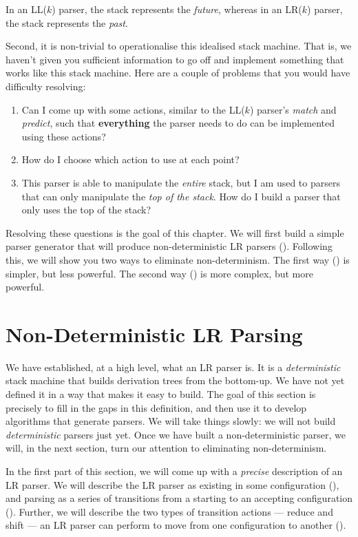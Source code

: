 In an LL($k$) parser, the stack represents the \textit{future}, whereas in an LR($k$) parser, the stack represents the \textit{past}.

Second, it is non-trivial to operationalise this idealised stack machine. That is, we haven't given you sufficient information to go off and implement something that works like this stack machine. Here are a couple of problems that you would have difficulty resolving:

\begin{enumerate}
    \item Can I come up with some actions, similar to the LL($k$) parser's \textit{match} and \textit{predict}, such that \textbf{everything} the parser needs to do can be implemented using these actions?
    \item How do I choose which action to use at each point?
    \item This parser is able to manipulate the \textit{entire} stack, but I am used to parsers that can only manipulate the \textit{top of the stack}. How do I build a parser that only uses the top of the stack?
\end{enumerate}

Resolving these questions is the goal of this chapter. We will first build a simple parser generator that will produce non-deterministic LR parsers (). Following this, we will show you two ways to eliminate non-determinism. The first way () is simpler, but less powerful. The second way () is more complex, but more powerful.


\section{Non-Deterministic LR Parsing}\label{section:lr-basics}
We have established, at a high level, what an LR parser is. It is a \textit{deterministic} stack machine that builds derivation trees from the bottom-up. We have not yet defined it in a way that makes it easy to build. The goal of this section is precisely to fill in the gaps in this definition, and then use it to develop algorithms that generate parsers. We will take things slowly: we will not build \textit{deterministic} parsers just yet. Once we have built a non-deterministic parser, we will, in the next section, turn our attention to eliminating non-determinism. 

In the first part of this section, we will come up with a \textit{precise} description of an LR parser. We will describe the LR parser as existing in some configuration (), and parsing as a series of transitions from a starting to an accepting configuration (). Further, we will describe the two types of transition actions --- reduce and shift --- an LR parser can perform to move from one configuration to another ().

